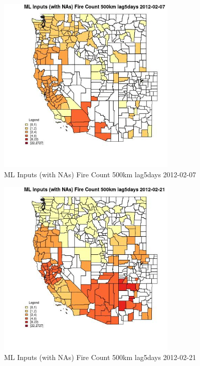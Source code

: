\begin{figure} 
\centering  
\includegraphics[width=0.77\textwidth]{Code_Outputs/Report_ML_input_PM25_Step4_part_f_de_duplicated_aveswNAs_CountyFire_Count_500km_lag5daysMean2012-02-07.jpg} 
\caption{\label{fig:Report_ML_input_PM25_Step4_part_f_de_duplicated_aveswNAsCountyFire_Count_500km_lag5daysMean2012-02-07}ML Inputs (with NAs) Fire Count 500km lag5days 2012-02-07} 
\end{figure} 
 

\begin{figure} 
\centering  
\includegraphics[width=0.77\textwidth]{Code_Outputs/Report_ML_input_PM25_Step4_part_f_de_duplicated_aveswNAs_CountyFire_Count_500km_lag5daysMean2012-02-21.jpg} 
\caption{\label{fig:Report_ML_input_PM25_Step4_part_f_de_duplicated_aveswNAsCountyFire_Count_500km_lag5daysMean2012-02-21}ML Inputs (with NAs) Fire Count 500km lag5days 2012-02-21} 
\end{figure} 
 

